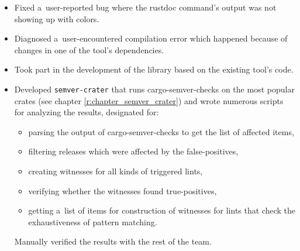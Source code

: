 \documentclass[licencjacka,en]{pracamgr}
\begin{document}
\begin{itemize}
\begin{itemize}
			\item Fixed a~user-reported bug where the rustdoc command's output was not showing up
				with colors.
			\item Diagnosed a~user-encountered compilation error which happened because of changes
				in one of the tool's dependencies.
			\item Took part in the development of the library based on the existing tool's code.
			\item Developed \texttt{semver-crater} that runs cargo-semver-checks on the most
				popular crates (see chapter \ref{r:chapter_semver_crater})
				and wrote numerous scripts for analyzing the results, designated for:
				\begin{itemize}
					\item parsing the output of cargo-semver-checks to get the list of
						affected items,
					\item filtering releases which were affected by the 
						false-positives,
					\item creating witnesses for all kinds of triggered lints,
					\item verifying whether the witnesses found true-positives,
					\item getting a~list of items for construction of witnesses
						for lints that check the exhaustiveness of pattern matching.
				\end{itemize}
				Manually verified the results with the rest of the team.
		\end{itemize}


\end{itemize}
\end{document}
